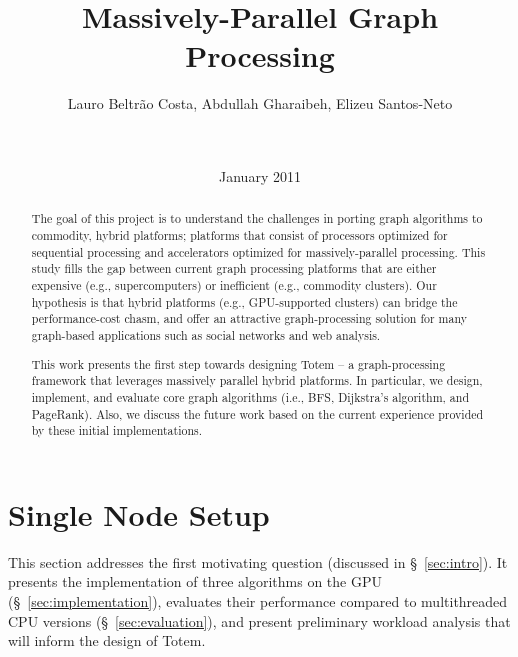 \documentclass{acm_proc_article-sp}[12pt]
\title{Massively-Parallel Graph Processing}
\author{
\alignauthor 
Lauro Beltr\~ao Costa, Abdullah Gharaibeh, Elizeu
Santos-Neto\vspace{3mm}\\
       \affaddr{\small{University of British Columbia}}\\
       \affaddr{\small{2332 Main Mall, Vancouver, BC, CANADA}}\\
       \email{\small{\{lauroc,abdullah,elizeus\}@ece.ubc.ca}}
}
\date{ January 2011}
\newcommand{\comment}[2]{\begin{center}\colorbox{#1}{\parbox{0.85\linewidth}{\textit{{#2}}}}\end{center}}
\newcommand{\abdullah}[1]{\comment{orange}{{Abdullah: #1}}}
\newcommand{\lauro}[1]{\comment{midblue}{{Lauro: #1}}}
\newcommand{\elizeu}[1]{\comment{lightgreen}{{Elizeu: #1}}}
\begin{document}
\maketitle


\begin{abstract}
The goal of this project is to understand the challenges in porting graph algorithms to commodity, hybrid platforms; platforms that consist of processors optimized for sequential processing and accelerators optimized for massively-parallel processing. This study fills the gap between current graph processing platforms that are either expensive (e.g., supercomputers) or inefficient (e.g., commodity clusters). Our hypothesis is that hybrid platforms (e.g., GPU-supported clusters) can bridge the performance-cost chasm, and offer an attractive graph-processing solution for many graph-based applications such as social networks and web analysis.

This work presents the first step towards designing {\sc Totem} -- a graph-processing framework that leverages massively parallel hybrid platforms. In particular, we design, implement, and evaluate core graph algorithms (i.e., BFS, Dijkstra's algorithm, and PageRank). Also, we discuss the future work based on the current experience provided by these initial implementations.
\end{abstract}







\section{Single Node Setup}
\label{sec:single}

This section addresses the first motivating question (discussed in \S~\ref{sec:intro}). It presents the implementation of three algorithms on the GPU (\S~\ref{sec:implementation}), evaluates their performance compared to multithreaded CPU versions (\S~\ref{sec:evaluation}), and present preliminary workload analysis that will inform the design of {\sc Totem}.
\end{document}
